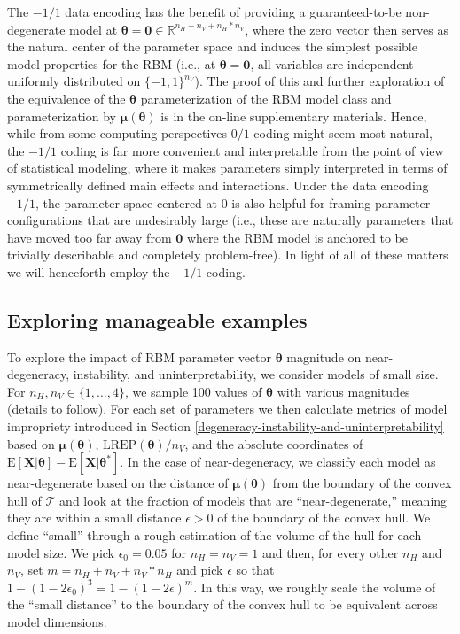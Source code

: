 \documentclass[AMS,STIX1COL]{WileyNJD-v2}
\newcommand{\nv}{{n_{\scriptscriptstyle V}}}
\newcommand{\nh}{{n_{\scriptscriptstyle H}}}
\begin{document}
The \(-1/1\) data encoding has the benefit of providing a
guaranteed-to-be non-degenerate model at
\(\boldsymbol \theta = \boldsymbol 0 \in \mathbb{R}^{\nh + \nv + \nh*\nv}\),
where the zero vector then serves as the natural center of the parameter
space and induces the simplest possible model properties for the RBM
(i.e., at \(\boldsymbol \theta = \boldsymbol 0\), all variables are
independent uniformly distributed on \(\{-1,1\}^\nv\)). The proof of
this and further exploration of the equivalence of the
\(\boldsymbol \theta\) parameterization of the RBM model class and
parameterization by \(\boldsymbol \mu(\boldsymbol \theta)\) is in the
on-line supplementary materials. Hence, while from some computing
perspectives \(0/1\) coding might seem most natural, the \(-1/1\) coding
is far more convenient and interpretable from the point of view of
statistical modeling, where it makes parameters simply interpreted in
terms of symmetrically defined main effects and interactions. Under the
data encoding \(-1/1\), the parameter space centered at 0 is also
helpful for framing parameter configurations that are undesirably large
(i.e., these are naturally parameters that have moved too far away from
\(\bm{0}\) where the RBM model is anchored to be trivially describable
and completely problem-free). In light of all of these matters we will
henceforth employ the \(-1/1\) coding.

\hypertarget{exploring-manageable-examples}{%
\subsection{Exploring manageable
examples}\label{exploring-manageable-examples}}

To explore the impact of RBM parameter vector \(\boldsymbol \theta\)
magnitude on near-degeneracy, instability, and uninterpretability, we
consider models of small size. For \(\nh, \nv \in \{1, \dots, 4\}\), we
sample 100 values of \(\boldsymbol \theta\) with various magnitudes
(details to follow). For each set of parameters we then calculate
metrics of model impropriety introduced in Section
\ref{degeneracy-instability-and-uninterpretability} based on
\(\boldsymbol \mu(\boldsymbol \theta)\),
\(\text{LREP}(\boldsymbol \theta)/\nv\), and the absolute coordinates of
\(\text{E}\left[\boldsymbol X | \boldsymbol \theta\right] - \text{E}\left[\boldsymbol X | \boldsymbol \theta^* \right]\).
In the case of near-degeneracy, we classify each model as
near-degenerate based on the distance of
\(\boldsymbol \mu(\boldsymbol \theta)\) from the boundary of the convex
hull of \(\mathcal{T}\) and look at the fraction of models that are
``near-degenerate,'' meaning they are within a small distance
\(\epsilon > 0\) of the boundary of the convex hull. We define ``small''
through a rough estimation of the volume of the hull for each model
size. We pick \(\epsilon_0 = 0.05\) for \(\nh=\nv=1\) and then, for
every other \(\nh\) and \(\nv\), set \(m=\nh+\nv+\nv*\nh\) and pick
\(\epsilon\) so that \(1-(1-2\epsilon_0)^3 = 1 - (1-2\epsilon)^m\). In
this way, we roughly scale the volume of the ``small distance'' to the
boundary of the convex hull to be equivalent across model dimensions.
\end{document}
